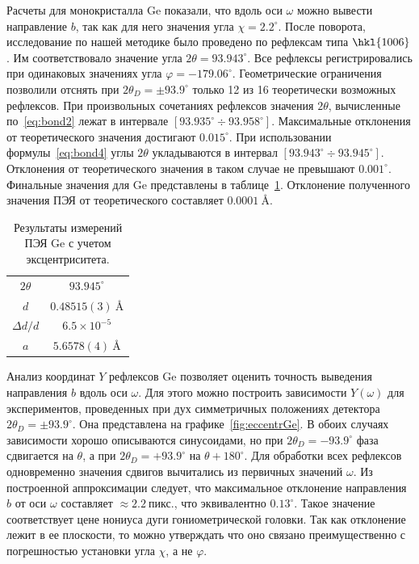 \documentclass[a4paper,14pt]{extarticle}
\newcommand{\unit}[1]{ \ \text{#1}}
\newcommand{\degree}{^\circ}
\newcommand{\range}[2]{[#1\div#2]}
\newcounter{x}
\begin{document}
Расчеты для монокристалла Ge показали, что вдоль оси $\omega$ можно вывести направление $b$, так как для него значения угла $\chi = 2.2\degree$.
После поворота, исследование по нашей методике было проведено по рефлексам типа $\hkl{10 0 6}$.
Им соответствовало значение угла $2\theta = 93.943\degree$.
Все рефлексы регистрировались при одинаковых значениях угла $\varphi = -179.06\degree$.
Геометрические ограничения позволили отснять при $2\theta_D = \pm 93.9\degree$ только 12 из 16 теоретически возможных рефлексов.
При произвольных сочетаниях рефлексов значения $2\theta$, вычисленные по~\ref{eq:bond2} лежат в интервале $\range{93.935\degree}{93.958\degree}$.
Максимальные отклонения от теоретического значения достигают $0.015\degree$.
При использовании формулы~\ref{eq:bond4} углы $2\theta$ укладываются в интервал $\range{93.943\degree}{93.945\degree}$.
Отклонения от теоретического значения в таком случае не превышают $0.001\degree$.
Финальные значения для Ge представлены в таблице~\ref{tab:Ge:eccentr}.
Отклонение полученного значения ПЭЯ от теоретического составляет $0.0001\unit{\AA}$.
\begin{table}[ht!]
    \centering
    \begin{tabular}{ |c|c| }
        \hline
        $2\theta$ & $93.945\degree$ \\
        $d$ & $0.48515 (3)\unit{\AA}$ \\
        $\Delta d / d$ & $6.5 \times 10^{-5}$ \\
        $a$ & $5.6578 (4)\unit{\AA}$ \\
        \hline
    \end{tabular}
    \caption{Результаты измерений ПЭЯ Ge с учетом эксцентриситета.}
    \label{tab:Ge:eccentr}
\end{table}

Анализ координат $Y$ рефлексов Ge позволяет оценить точность выведения направления $b$ вдоль оси $\omega$.
Для этого можно построить зависимости $Y(\omega)$ для экспериментов, проведенных при дух симметричных положениях детектора $2\theta_D = \pm 93.9\degree$.
Она представлена на графике~\ref{fig:eccentrGe}.
В обоих случаях зависимости хорошо описываются синусоидами, но при $2\theta_D = -93.9\degree$ фаза сдвигается на $\theta$, а при $2\theta_D = +93.9\degree$ на $\theta + 180\degree$.
Для обработки всех рефлексов одновременно значения сдвигов вычитались из первичных значений $\omega$.
Из построенной аппроксимации следует, что максимальное отклонение направления $b$ от оси $\omega$ составляет $\approx 2.2\unit{пикс.}$, что эквивалентно $0.13\degree$.
Такое значение соответствует цене нониуса дуги гониометрической головки.
Так как отклонение лежит в ее плоскости, то можно утверждать что оно связано преимущественно с погрешностью установки угла $\chi$, а не $\varphi$.
\end{document}
